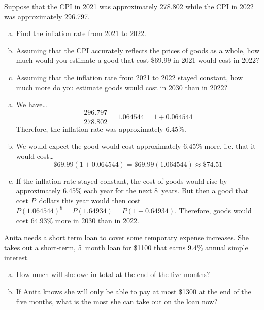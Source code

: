 \documentclass[11pt,letterpaper]{article}
\begin{document}

 Suppose that the CPI in 2021 was approximately 278.802 while the CPI in 2022 was approximately 296.797. 
	\begin{enumerate}[(a)]
	\item Find the inflation rate from 2021 to 2022. 
	\item Assuming that the CPI accurately reflects the prices of goods as a whole, how much would you estimate a good that cost \$69.99 in 2021 would cost in 2022?
	\item Assuming that the inflation rate from 2021 to 2022 stayed constant, how much more do you estimate goods would cost in 2030 than in 2022?
	\end{enumerate} \pspace

\sol 
\begin{enumerate}[(a)]
\item We have\dots
	\[
	\dfrac{296.797}{278.802}= 1.064544= 1 + 0.064544
	\]
Therefore, the inflation rate was approximately 6.45\%. \pspace

\item We would expect the good would cost approximately 6.45\% more, i.e. that it would cost\dots
	\[
	\$69.99(1 + 0.064544)= \$69.99 (1.064544) \approx \$74.51
	\] \pspace

\item If the inflation rate stayed constant, the cost of goods would rise by approximately 6.45\% each year for the next 8~years. But then a good that cost $P$~dollars this year would then cost $P(1.064544)^8= P(1.64934)= P(1 + 0.64934)$. Therefore, goods would cost 64.93\% more in 2030 than in 2022. 
\end{enumerate}



\newpage



 Anita needs a short term loan to cover some temporary expense increases. She takes out a short-term, 5~month loan for \$1100 that earns 9.4\% annual simple interest. 
	\begin{enumerate}[(a)]
	\item How much will she owe in total at the end of the five months?
	\item If Anita knows she will only be able to pay at most \$1300 at the end of the five months, what is the most she can take out on the loan now?
	\end{enumerate} \pspace
\end{document}
